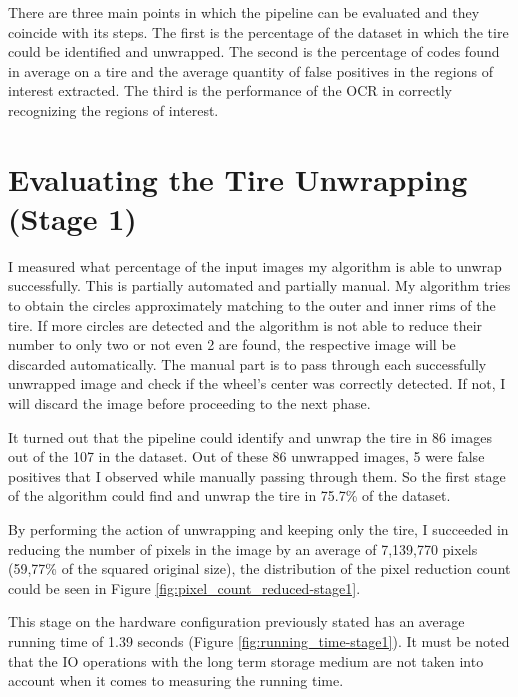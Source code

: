There are three main points in which the pipeline can be evaluated and they coincide with its steps. The first is the percentage of the dataset in which the tire could be identified and unwrapped. The second is the percentage of codes found in average on a tire and the average quantity of false positives in the regions of interest extracted. The third is the performance of the OCR in correctly recognizing the regions of interest.

\section{Evaluating the Tire Unwrapping (Stage 1)}\label{section:evaluation-tire_unwrapping}

I measured what percentage of the input images my algorithm is able to unwrap successfully. This is partially automated and partially manual. My algorithm tries to obtain the circles approximately matching to the outer and inner rims of the tire. If more circles are detected and the algorithm is not able to reduce their number to only two or not even 2 are found, the respective image will be discarded automatically. The manual part is to pass through each successfully unwrapped image and check if the wheel's center was correctly detected. If not, I will discard the image before proceeding to the next phase.

It turned out that the pipeline could identify and unwrap the tire in 86 images out of the 107 in the dataset. Out of these 86 unwrapped images, 5 were false positives that I observed while manually passing through them. So the first stage of the algorithm could find and unwrap the tire in 75.7\% of the dataset.

By performing the action of unwrapping and keeping only the tire, I succeeded in reducing the number of pixels in the image by an average of 7,139,770 pixels (59,77\% of the squared original size), the distribution of the pixel reduction count could be seen in Figure \ref{fig:pixel_count_reduced-stage1}.

This stage on the hardware configuration previously stated has an average running time of 1.39 seconds (Figure \ref{fig:running_time-stage1}). It must be noted that the IO operations with the long term storage medium are not taken into account when it comes to measuring the running time.

